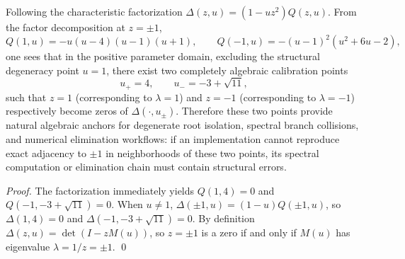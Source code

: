 
\begin{corollary}[Integer-level resonance points of the synchronization kernel parameter family provide algebraic calibration: isolated points with exact \texorpdfstring{$\lambda=\pm1$}{lambda=±1} exist in the positive parameter domain (230)]\label{cor:real-input-40-integer-resonance-calibration}
Following the characteristic factorization \(\Delta(z,u)=(1-uz^2)Q(z,u)\).
From the factor decomposition at \(z=\pm1\),
\[
Q(1,u)=-u(u-4)(u-1)(u+1),\qquad Q(-1,u)=-(u-1)^2(u^2+6u-2),
\]
one sees that in the positive parameter domain, excluding the structural degeneracy point \(u=1\), there exist two completely algebraic calibration points
\[
u_+=4,\qquad u_-=-3+\sqrt{11},
\]
such that \(z=1\) (corresponding to \(\lambda=1\)) and \(z=-1\) (corresponding to \(\lambda=-1\)) respectively become zeros of \(\Delta(\cdot,u_\pm)\).
Therefore these two points provide natural algebraic anchors for degenerate root isolation, spectral branch collisions, and numerical elimination workflows: if an implementation cannot reproduce exact adjacency to \(\pm1\) in neighborhoods of these two points, its spectral computation or elimination chain must contain structural errors.
\end{corollary}
\begin{proof}
The factorization immediately yields \(Q(1,4)=0\) and \(Q(-1,-3+\sqrt{11})=0\).
When \(u\neq 1\), \(\Delta(\pm 1,u)=(1-u)Q(\pm 1,u)\), so \(\Delta(1,4)=0\) and \(\Delta(-1,-3+\sqrt{11})=0\).
By definition \(\Delta(z,u)=\det(I-zM(u))\), so \(z=\pm1\) is a zero if and only if \(M(u)\) has eigenvalue \(\lambda=1/z=\pm1\). \qed
\end{proof}


